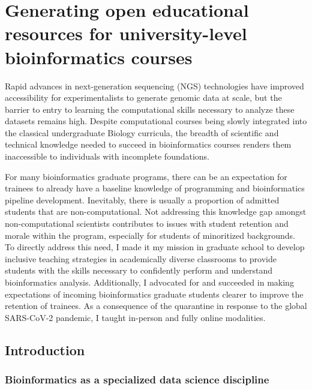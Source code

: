 \chapter{Generating open educational resources for university-level bioinformatics courses}
\label{chap:Bioinformatics education}

Rapid advances in next-generation sequencing (NGS) technologies have improved accessibility for experimentalists to generate genomic data at scale, but the barrier to entry to learning the computational skills necessary to analyze these datasets remains high. Despite computational courses being slowly integrated into the classical undergraduate Biology curricula, the breadth of scientific and technical knowledge needed to succeed in bioinformatics courses renders them inaccessible to individuals with incomplete foundations.

For many bioinformatics graduate programs, there can be an expectation for trainees to already have a baseline knowledge of programming and bioinformatics pipeline development. Inevitably, there is usually a proportion of admitted students that are non-computational. Not addressing this knowledge gap amongst non-computational scientists contributes to issues with student retention and morale within the program, especially for students of minoritized backgrounds. To directly address this need, I made it my mission in graduate school to develop inclusive teaching strategies in academically diverse classrooms to provide students with the skills necessary to confidently perform and understand bioinformatics analysis. Additionally, I advocated for and succeeded in making expectations of incoming bioinformatics graduate students clearer to improve the retention of trainees. As a consequence of the quarantine in response to the global SARS-CoV-2 pandemic, I taught in-person and fully online modalities. 

\section{Introduction}

\subsection{Bioinformatics as a specialized data science discipline}

